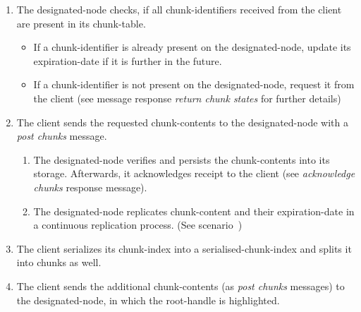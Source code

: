 \begin{enumerate}
\begin{enumerate}
            \item The \gls{designated-node} checks, if all \glspl{chunk-identifier} received from the \gls{client} are present in its \gls{chunk-table}.
                \begin{itemize}
                    \item If a \gls{chunk-identifier} is already present on the \gls{designated-node}, update its \gls{expiration-date} if it is further in the future.
                    \item If a \gls{chunk-identifier} is not present on the \gls{designated-node}, request it from the \gls{client} (see message response \emph{return chunk states} for further details)
                \end{itemize}
            \item The \gls{client} sends the requested \glspl{chunk-content} to the \gls{designated-node} with a \emph{post chunks} message. %
                \begin{enumerate}
                    \item The \gls{designated-node} verifies and persists the \glspl{chunk-content} into its \gls{storage}. Afterwards, it acknowledges receipt to the \gls{client} (see \emph{acknowledge chunks} response message).
                    \item The \gls{designated-node} replicates \gls{chunk-content} and their \gls{expiration-date} in a continuous replication process. (See scenario~)
                \end{enumerate}
            \item The \gls{client} serializes its \gls{chunk-index} into a \gls{serialised-chunk-index} and splits it into \glspl{chunk} as well. %
            \item The \gls{client} sends the additional \glspl{chunk-content} (as \emph{post chunks} messages) to the \gls{designated-node}, in which the \gls{root-handle} is highlighted. %
        \end{enumerate}
\end{enumerate}

